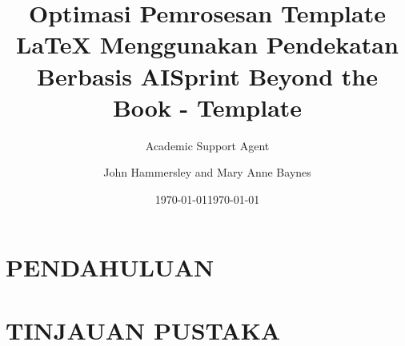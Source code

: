\documentclass{tufte-handout}
\title{Optimasi Pemrosesan Template LaTeX Menggunakan Pendekatan Berbasis AI}
\author{Academic Support Agent}
\date{\today}
\begin{document}
\maketitle

\begin{abstract}

\end{abstract}

\chapter{PENDAHULUAN}


\chapter{TINJAUAN PUSTAKA}


\usepackage{booksprint}

\title[Short Title]{Sprint Beyond the Book - Template}
\author{John Hammersley and Mary Anne Baynes}
\date{\today}
\end{document}
